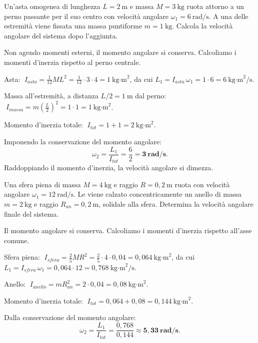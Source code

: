 
\begin{question}[ID=3.4, subtitle={Asta con perno al centro a cui si aggiunge una massa a un'estremità}, tags={corpo rigido, conservazione momento angolare, asta}, difficulty=media]
Un'asta omogenea di lunghezza $L = 2\ \text{m}$ e massa $M = 3\ \text{kg}$ ruota attorno a un perno passante per il suo centro con velocità angolare $\omega_1 = 6\ \text{rad/s}$. A una delle estremità viene fissata una massa puntiforme $m = 1\ \text{kg}$. Calcola la velocità angolare del sistema dopo l'aggiunta.
\begin{solution}
Non agendo momenti esterni, il momento angolare si conserva. Calcoliamo i momenti d'inerzia rispetto al perno centrale.

\noindent Asta: $\;I_{asta} = \tfrac{1}{12}ML^2 = \tfrac{1}{12}\cdot 3\cdot 4 = 1\ \text{kg·m}^2$, da cui $L_1 = I_{asta}\,\omega_1 = 1\cdot 6 = 6\ \text{kg·m}^2/\text{s}$.

\noindent Massa all'estremità, a distanza $L/2 = 1\ \text{m}$ dal perno: $\;I_{massa} = m\left(\tfrac{L}{2}\right)^2 = 1\cdot 1 = 1\ \text{kg·m}^2$.

\noindent Momento d'inerzia totale: $\;I_{tot} = 1 + 1 = 2\ \text{kg·m}^2$.

Imponendo la conservazione del momento angolare:
\[
\omega_2 = \frac{L_1}{I_{tot}} = \frac{6}{2} = \mathbf{3\ \text{rad/s}}.
\]
Raddoppiando il momento d'inerzia, la velocità angolare si dimezza.
\end{solution}
\end{question}


\begin{question}[ID=3.5, subtitle={Sfera su cui viene inserito concentricamente un anello}, tags={corpo rigido, conservazione momento angolare}, difficulty=media]
Una sfera piena di massa $M = 4\ \text{kg}$ e raggio $R = 0{,}2\ \text{m}$ ruota con velocità angolare $\omega_1 = 12\ \text{rad/s}$. Le viene calzato concentricamente un anello di massa $m = 2\ \text{kg}$ e raggio $R_{an} = 0{,}2\ \text{m}$, solidale alla sfera. Determina la velocità angolare finale del sistema.
\begin{solution}
Il momento angolare si conserva. Calcoliamo i momenti d'inerzia rispetto all'asse comune.

\noindent Sfera piena: $\;I_{sfera} = \tfrac{2}{5}MR^2 = \tfrac{2}{5}\cdot 4\cdot 0{,}04 = 0{,}064\ \text{kg·m}^2$, da cui $L_1 = I_{sfera}\,\omega_1 = 0{,}064\cdot 12 = 0{,}768\ \text{kg·m}^2/\text{s}$.

\noindent Anello: $\;I_{anello} = mR_{an}^2 = 2\cdot 0{,}04 = 0{,}08\ \text{kg·m}^2$.

\noindent Momento d'inerzia totale: $\;I_{tot} = 0{,}064 + 0{,}08 = 0{,}144\ \text{kg·m}^2$.

Dalla conservazione del momento angolare:
\[
\omega_2 = \frac{L_1}{I_{tot}} = \frac{0{,}768}{0{,}144} \approx \mathbf{5{,}33\ \text{rad/s}}.
\]
\end{solution}
\end{question}

